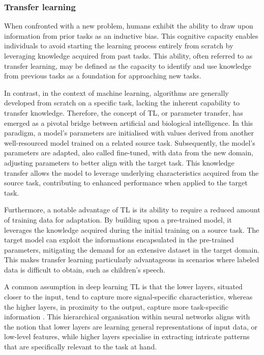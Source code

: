 \subsubsection{Transfer learning}%
\label{section:TL}

When confronted with a new problem, humans exhibit the ability to draw upon information from prior tasks as an inductive bias. This cognitive capacity enables individuals to avoid starting the learning process entirely from scratch by leveraging knowledge acquired from past tasks. This ability, often referred to as transfer learning, may be defined as the capacity to identify and use knowledge from previous tasks as a foundation for approaching new tasks.

In contrast, in the context of machine learning, algorithms are generally developed from scratch on a specific task, lacking the inherent capability to transfer knowledge. Therefore, the concept of \ac{TL}, or parameter transfer, has emerged as a pivotal bridge between artificial and biological intelligence. In this paradigm, a model's parameters are initialised with values derived from another well-resourced model trained on a related source task. Subsequently, the model's parameters are adapted, also called fine-tuned, with data from the new domain, adjusting parameters to better align with the target task. This knowledge transfer allows the model to leverage underlying characteristics acquired from the source task, contributing to enhanced performance when applied to the target task.

Furthermore, a notable advantage of \ac{TL} is its ability to require a reduced amount of training data for adaptation. By building upon a pre-trained model, it leverages the knowledge acquired during the initial training on a source task. The target model can exploit the informations encapsulated in the pre-trained parameters, mitigating the demand for an extensive dataset in the target domain. This makes transfer learning particularly advantageous in scenarios where labeled data is difficult to obtain, such as children's speech.

A common assumption in deep learning \ac{TL} is that the lower layers, situated closer to the input, tend to capture more signal-specific characteristics, whereas the higher layers, in proximity to the output, capture more task-specific information \cite{tfbased, yosinski2014transferable}. This hierarchical organisation within neural networks aligns with the notion that lower layers are learning general representations of input data, or low-level features, while higher layers specialise in extracting intricate patterns that are specifically relevant to the task at hand. 

